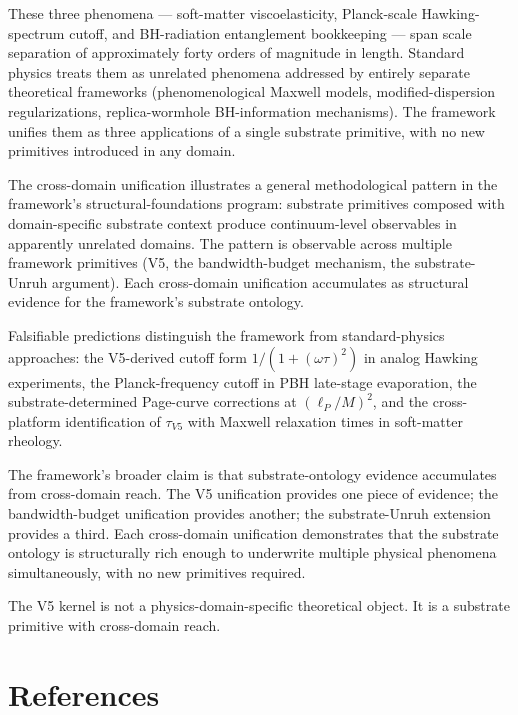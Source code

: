 \documentclass[11pt,a4paper]{article}
\begin{document}
These three phenomena --- soft-matter viscoelasticity, Planck-scale Hawking-spectrum cutoff, and BH-radiation entanglement bookkeeping --- span scale separation of approximately forty orders of magnitude in length. Standard physics treats them as unrelated phenomena addressed by entirely separate theoretical frameworks (phenomenological Maxwell models, modified-dispersion regularizations, replica-wormhole BH-information mechanisms). The framework unifies them as three applications of a single substrate primitive, with no new primitives introduced in any domain.

The cross-domain unification illustrates a general methodological pattern in the framework's structural-foundations program: substrate primitives composed with domain-specific substrate context produce continuum-level observables in apparently unrelated domains. The pattern is observable across multiple framework primitives (V5, the bandwidth-budget mechanism, the substrate-Unruh argument). Each cross-domain unification accumulates as structural evidence for the framework's substrate ontology.

Falsifiable predictions distinguish the framework from standard-physics approaches: the V5-derived cutoff form $1/(1+(\omega\tau)^{2})$ in analog Hawking experiments, the Planck-frequency cutoff in PBH late-stage evaporation, the substrate-determined Page-curve corrections at $(\ell_P/M)^{2}$, and the cross-platform identification of $\tau_{V5}$ with Maxwell relaxation times in soft-matter rheology.

The framework's broader claim is that substrate-ontology evidence accumulates from cross-domain reach. The V5 unification provides one piece of evidence; the bandwidth-budget unification provides another; the substrate-Unruh extension provides a third. Each cross-domain unification demonstrates that the substrate ontology is structurally rich enough to underwrite multiple physical phenomena simultaneously, with no new primitives required.

The V5 kernel is not a physics-domain-specific theoretical object. It is a substrate primitive with cross-domain reach.

\section*{References}
\end{document}
